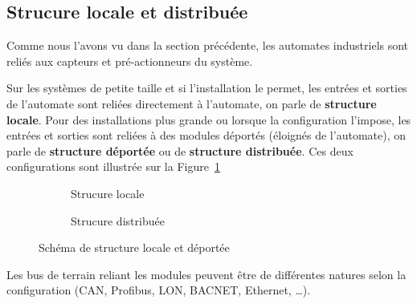 \subsection{Strucure locale et distribuée}
Comme nous l'avons vu dans la section précédente, les automates industriels sont reliés aux capteurs et pré-actionneurs du système.

Sur les systèmes de petite taille et si l'installation le permet, les entrées et sorties de l'automate sont reliées directement à l'automate, on parle de \textbf{structure locale}. Pour des installations plus grande ou lorsque la configuration l'impose, les entrées et sorties sont reliées à des modules déportés (éloignés de l'automate), on parle de \textbf{structure déportée} ou de \textbf{structure distribuée}. Ces deux configurations sont illustrée sur la Figure~\ref{fig:local_deporte}

\begin{figure}[h]
	\begin{subfigure}[b]{.49\textwidth}
		\centering
		
		\caption{Strucure locale}
	\end{subfigure}
	\begin{subfigure}[b]{.49\textwidth}
	\centering
	
	\caption{Strucure distribuée}
	\end{subfigure}
	\caption{Schéma de structure locale et déportée}
	\label{fig:local_deporte}
\end{figure}

Les bus de terrain reliant les modules peuvent être de différentes natures selon la configuration (CAN, Profibus, LON, BACNET, Ethernet, \dots).

